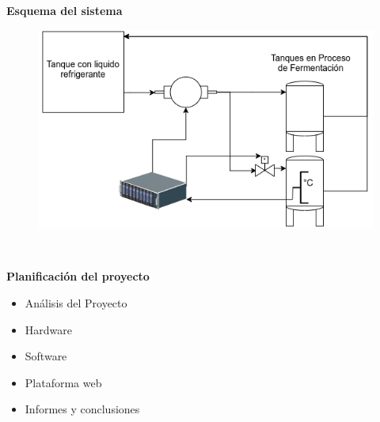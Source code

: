 \documentclass[11pt]{beamer}
\begin{document}
\begin{frame}{\textbf{\LARGE{Esquema del sistema}}}
  \vspace{-.7cm}
  \begin{figure}[H]
    {\includegraphics[width=.8\textwidth]{./imagenes/diagrama_del_sistema.png}}
  \end{figure}	
  \vspace{-55px}
  \hspace{25px}\small\color{black}{Dispositivo}\\
  \hspace{20px}\small\color{black}{Implementado}
\end{frame}


\begin{frame}{\textbf{\LARGE{Planificación del proyecto }}}
  \fontsize{18pt}{18}\selectfont
  \begin{itemize}
    \item Análisis del Proyecto
      \vspace{10px}
    \item Hardware
      \vspace{10px}
    \item Software
      \vspace{10px}
    \item Plataforma web
      \vspace{10px}
    \item Informes y conclusiones
  \end{itemize}	
\end{frame}
\end{document}
